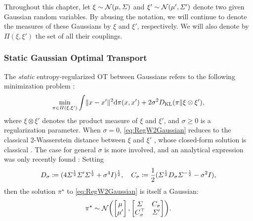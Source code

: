 Throughout this chapter, let $\xi \sim \mathcal{N}(\mu, \Sigma)$ and $\xi' \sim \mathcal{N}(\mu', \Sigma')$ denote two given Gaussian random variables. By abusing the notation, we will continue to denote the measures of these Gaussians by $\xi$ and $\xi'$, respectively. We will also denote by $\Pi(\xi,\xi')$ the set of all their couplings. 


\subsubsection{Static Gaussian Optimal Transport}
\label{sec:staticGOT}

The \emph{static} entropy-regularized \acrshort{OT} between Gaussians refers to the following minimization problem \citep{peyre2019computational}:
\begin{equation}
\label{eq:RegW2Gaussian}
\min_{\pi \in \Pi(\xi, \xi')} \int  \lVert x-x'\rVert^2  \mathrm{d} \pi(x, x') + 2\sigma^2 D_{\mathrm{KL}}(\pi \| \xi \otimes \xi'),
\end{equation}where $\xi\otimes\xi'$ denotes the product measure of $\xi$ and $\xi'$, and $\sigma \geq 0$ is a regularization parameter. When $\sigma = 0$, \eqref{eq:RegW2Gaussian} reduces to the classical 2-Wasserstein distance between $\xi$ and $\xi'$ \citep{villani2009optimal}, whose closed-form solution is classical \citep{dowson1982frechet, olkin1982distance}. The case for general $\sigma$ is more involved, and an analytical expression was only recently found \citep{bojilov2016matching, del2020statistical, janati2020entropic, mallasto2021entropy}: Setting%
\begin{equation}
\label{eq:Cstar}
D_\sigma \coloneqq ( 4\Sigma^{\frac{1}{2}} \Sigma' \Sigma^{\frac{1}{2}} +  \sigma^4I  )^{\frac{1}{2}},\quad C_\sigma \coloneqq \frac{1}{2}(\Sigma^{\frac{1}{2}} D_\sigma \Sigma^{-\frac{1}{2}} - \sigma^2I),
\end{equation}
then the solution $\pi^\star$ to \eqref{eq:RegW2Gaussian} is itself a Gaussian:
\begin{align}
\label{eq:StaticGaussianSB-sol}
\pi^\star \sim \Ncal \parens*{  \begin{bmatrix}
\mu \\
\mu'
\end{bmatrix},  \begin{bmatrix}
\Sigma&C_\sigma\\
C_\sigma^\top&\Sigma'
\end{bmatrix}}.
\end{align}

